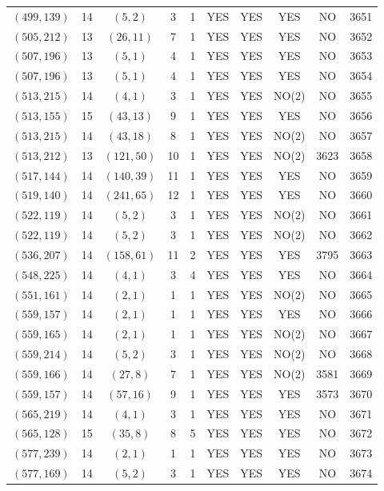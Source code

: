 \begin{longtable}{|c|c|c|c|c|c|c|c|c|c|}
$(499, 139)$ & 14 & $(5, 2)$ & 3 & 1 & YES & YES & YES & NO & 3651\\
$(505, 212)$ & 13 & $(26, 11)$ & 7 & 1 & YES & YES & YES & NO & 3652\\
$(507, 196)$ & 13 & $(5, 1)$ & 4 & 1 & YES & YES & YES & NO & 3653\\
$(507, 196)$ & 13 & $(5, 1)$ & 4 & 1 & YES & YES & YES & NO & 3654\\
$(513, 215)$ & 14 & $(4, 1)$ & 3 & 1 & YES & YES & NO(2) & NO & 3655\\
$(513, 155)$ & 15 & $(43, 13)$ & 9 & 1 & YES & YES & YES & NO & 3656\\
$(513, 215)$ & 14 & $(43, 18)$ & 8 & 1 & YES & YES & NO(2) & NO & 3657\\
$(513, 212)$ & 13 & $(121, 50)$ & 10 & 1 & YES & YES & NO(2) & 3623 & 3658\\
$(517, 144)$ & 14 & $(140, 39)$ & 11 & 1 & YES & YES & YES & NO & 3659\\
$(519, 140)$ & 14 & $(241, 65)$ & 12 & 1 & YES & YES & YES & NO & 3660\\
$(522, 119)$ & 14 & $(5, 2)$ & 3 & 1 & YES & YES & NO(2) & NO & 3661\\
$(522, 119)$ & 14 & $(5, 2)$ & 3 & 1 & YES & YES & NO(2) & NO & 3662\\
$(536, 207)$ & 14 & $(158, 61)$ & 11 & 2 & YES & YES & YES & 3795 & 3663\\
$(548, 225)$ & 14 & $(4, 1)$ & 3 & 4 & YES & YES & YES & NO & 3664\\
$(551, 161)$ & 14 & $(2, 1)$ & 1 & 1 & YES & YES & NO(2) & NO & 3665\\
$(559, 157)$ & 14 & $(2, 1)$ & 1 & 1 & YES & YES & YES & NO & 3666\\
$(559, 165)$ & 14 & $(2, 1)$ & 1 & 1 & YES & YES & NO(2) & NO & 3667\\
$(559, 214)$ & 14 & $(5, 2)$ & 3 & 1 & YES & YES & NO(2) & NO & 3668\\
$(559, 166)$ & 14 & $(27, 8)$ & 7 & 1 & YES & YES & NO(2) & 3581 & 3669\\
$(559, 157)$ & 14 & $(57, 16)$ & 9 & 1 & YES & YES & YES & 3573 & 3670\\
$(565, 219)$ & 14 & $(4, 1)$ & 3 & 1 & YES & YES & YES & NO & 3671\\
$(565, 128)$ & 15 & $(35, 8)$ & 8 & 5 & YES & YES & YES & NO & 3672\\
$(577, 239)$ & 14 & $(2, 1)$ & 1 & 1 & YES & YES & YES & NO & 3673\\
$(577, 169)$ & 14 & $(5, 2)$ & 3 & 1 & YES & YES & YES & NO & 3674\\

\end{longtable}
